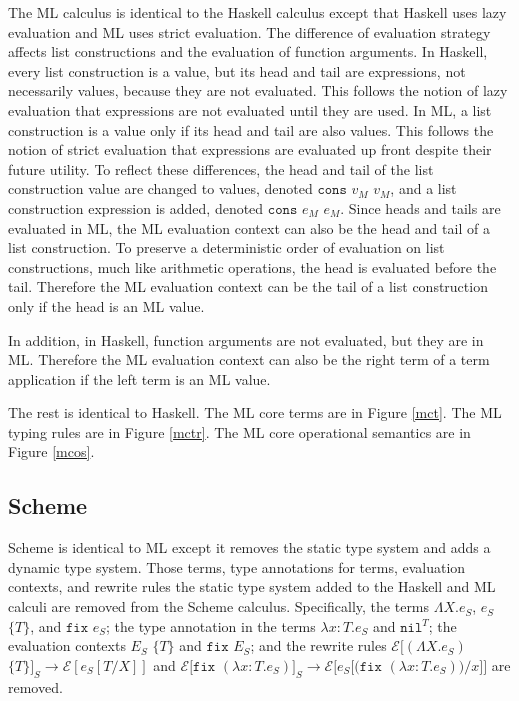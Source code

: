 The ML calculus is identical to the Haskell calculus except that Haskell uses lazy evaluation and ML uses strict evaluation.  The difference of evaluation strategy affects list constructions and the evaluation of function arguments.  In Haskell, every list construction is a value, but its head and tail are expressions, not necessarily values, because they are not evaluated.  This follows the notion of lazy evaluation that expressions are not evaluated until they are used.  In ML, a list construction is a value only if its head and tail are also values.  This follows the notion of strict evaluation that expressions are evaluated up front despite their future utility.  To reflect these differences, the head and tail of the list construction value are changed to values, denoted $\mathtt{cons}$ $v_{M}$ $v_{M}$, and a list construction expression is added, denoted $\mathtt{cons}$ $e_{M}$ $e_{M}$.  Since heads and tails are evaluated in ML, the ML evaluation context can also be the head and tail of a list construction.  To preserve a deterministic order of evaluation on list constructions, much like arithmetic operations, the head is evaluated before the tail.  Therefore the ML evaluation context can be the tail of a list construction only if the head is an ML value.  

In addition, in Haskell, function arguments are not evaluated, but they are in ML.  Therefore the ML evaluation context can also be the right term of a term application if the left term is an ML value.

The rest is identical to Haskell.  The ML core terms are in Figure \ref{mct}.  The ML typing rules are in Figure \ref{mctr}.  The ML core operational semantics are in Figure \ref{mcos}.

\subsection{Scheme}

Scheme is identical to ML except it removes the static type system and adds a dynamic type system.  Those terms, type annotations for terms, evaluation contexts, and rewrite rules the static type system added to the Haskell and ML calculi are removed from the Scheme calculus.  Specifically, the terms $\Lambda X.e_{S}$, $e_{S}$ $\lbrace T\rbrace$, and $\mathtt{fix}$ $e_{S}$; the type annotation in the terms $\lambda x:T.e_{S}$ and $\mathtt{nil}^{T}$; the evaluation contexts $E_{S}$ $\lbrace T\rbrace$ and $\mathtt{fix}$ $E_{S}$; and the rewrite rules $\mathscr{E}[(\Lambda X.e_{S})$ $\lbrace T\rbrace]_{S}\rightarrow\mathscr{E}[e_{S}[T/X]]$ and $\mathscr{E}[\mathtt{fix}$ $(\lambda x:T.e_{S})]_{S}\rightarrow\mathscr{E}[e_{S}[(\mathtt{fix}$ $(\lambda x:T.e_{S}))/x]]$ are removed.

